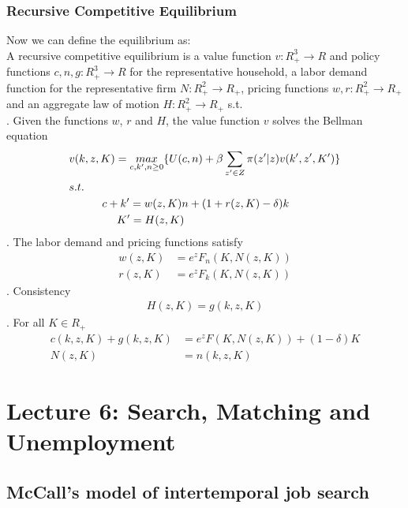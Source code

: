 \documentclass{article}
\begin{document}
\subsubsection{Recursive Competitive Equilibrium}
Now we can define the equilibrium as:\\
A recursive competitive equilibrium is a value function $v: R^3_+ \to R$ and policy functions $c, n, g: R^3_+ \to R$ for the representative household, a labor demand function for the representative firm $N: R^2_+ \to R_+$, pricing functions $w, r: R^2_+ \to R_+$ and an aggregate law of motion $H: R^2_+ \to R_+$ s.t.\\
. Given the functions $w$, $r$ and $H$, the value function $v$ solves the Bellman equation
\begin{align*}
	&v(k, z, K) = \mathop{max}\limits_{c, k^\prime, n \geq 0} \{U(c, n) + \beta \sum\limits_{z^\prime \in Z} \pi(z^\prime|z)v(k^\prime, z^\prime, K^\prime)\}\\
	&s.t.\\
	&\indent\indent c + k^\prime = w(z, K)n + (1 + r(z, K) - \delta)k\\
	&\indent\indent\ \ \  \ K^\prime = H(z, K)
\end{align*}
. The labor demand and pricing functions satisfy
\begin{align*}
	w(z, K) &= e^z F_n(K, N(z, K))\\
	r(z, K) &= e^z F_k(K, N(z, K))
\end{align*}
. Consistency
\begin{align*}
	H(z, K) = g(k, z, K)
\end{align*}
. For all $K \in R_+$
\begin{align*}
	c(k, z, K) + g(k, z, K) &= e^z F(K, N(z, K)) + (1 - \delta)K\\
	N(z, K) &= n(k, z, K)
\end{align*}



\newpage
\section{Lecture 6: Search, Matching and Unemployment}
\subsection{McCall's model of intertemporal job search}
\end{document}
